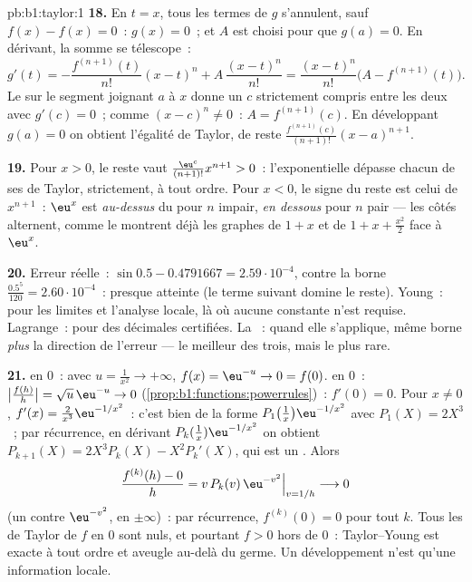 \begin{solution}{pb:b1:taylor:1}
\textbf{18.} En $t = x$, tous les termes de $g$ s'annulent, sauf $f(x)
- f(x) = 0$~: $g(x) = 0$~; et $A$ est choisi pour que $g(a) = 0$.
En dérivant, la somme se télescope~:
\[
g'(t) = -\frac{f^{(n+1)}(t)}{n!}(x - t)^n +
A\,\frac{(x-t)^n}{n!}
= \frac{(x-t)^n}{n!}\bigl(A - f^{(n+1)}(t)\bigr) .
\]
Le  sur le segment joignant $a$ à $x$ donne un $c$
strictement compris entre les deux avec $g'(c) = 0$~; comme
$(x - c)^n \neq 0$~: $A = f^{(n+1)}(c)$. En développant $g(a) = 0$ on
obtient l'égalité de Taylor, de reste
$\frac{f^{(n+1)}(c)}{(n+1)!}(x-a)^{n+1}$.

\textbf{19.} Pour $x > 0$, le reste vaut $\frac{\eu^{c}}
{(n+1)!}x^{n+1} > 0$~: l'exponentielle dépasse chacun de ses
 de Taylor, strictement, à tout ordre. Pour $x < 0$, le
signe du reste est celui de $x^{n+1}$~: $\eu^x$ est
\emph{au-dessus} du  pour $n$ impair, \emph{en dessous} pour
$n$ pair --- les côtés alternent, comme le montrent déjà les graphes
de $1 + x$ et de $1 + x + \frac{x^2}{2}$ face à $\eu^x$.

\textbf{20.} Erreur réelle~: $\sin 0.5 - 0.4791667 =
2.59\cdot10^{-4}$, contre la borne $\frac{0.5^5}{120} =
2.60\cdot10^{-4}$~: presque atteinte (le terme suivant domine le
reste). Young~: pour les limites et l'analyse locale, là où aucune
constante n'est requise. Lagrange~: pour des décimales certifiées.
La ~: quand elle s'applique, même borne \emph{plus}
la direction de l'erreur --- le meilleur des trois, mais le plus rare.

\textbf{21.}  en $0$~: avec $u = \frac{1}{x^2} \to
+\infty$, $f(x) = \eu^{-u} \to 0 = f(0)$.  en $0$~:
$\bigl|\frac{f(h)}{h}\bigr| = \sqrt u\,\eu^{-u} \to 0$
(\cref{prop:b1:functions:powerrules})~: $f'(0) = 0$. Pour $x \neq
0$, $f'(x) = \frac{2}{x^3}\eu^{-1/x^2}$~: c'est bien de la forme
$P_1\bigl(\frac1x\bigr)\eu^{-1/x^2}$ avec $P_1(X) = 2X^3$~;
par récurrence, en dérivant $P_k(\frac1x)\eu^{-1/x^2}$ on obtient
$P_{k+1}(X) = 2X^3 P_k(X) - X^2 P_k'(X)$, qui est un . Alors
\[
\frac{f^{(k)}(h) - 0}{h} = v\,P_k(v)\,\eu^{-v^2}
\Big|_{v = 1/h} \longrightarrow 0
\]
(un  contre $\eu^{-v^2}$,  en
$\pm\infty$)~: par récurrence, $f^{(k)}(0) = 0$ pour tout $k$. Tous
les  de Taylor de $f$ en $0$ sont nuls, et pourtant $f > 0$
hors de $0$~: Taylor--Young est exacte à tout ordre et aveugle au-delà
du germe. Un développement n'est qu'une information locale.


\end{solution}
